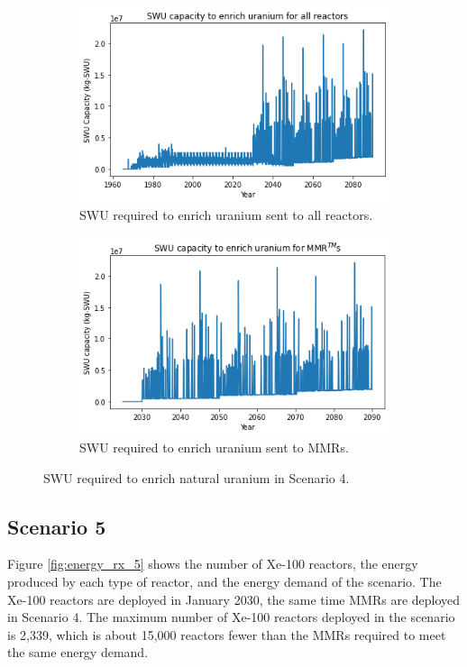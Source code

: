 \begin{figure}
    \centering
    \begin{subfigure}{0.45\textwidth}
        \centering
        \includegraphics[scale=0.4]{../figures/totalswu_scenarios_4.png}
        \caption{\gls{SWU} required to enrich uranium sent to all reactors.}
        \label{fig:totalswu_4}
    \end{subfigure}
    \hspace{0.8cm}
    \begin{subfigure}{0.45\textwidth}
        \centering
        \includegraphics[scale=0.4]{../figures/haleuSWU_scenarios_4.png}
        \caption{\gls{SWU} required to enrich uranium sent to \glspl{MMR}.}
        \label{fig:haleuswu_4}
    \end{subfigure}
    \caption{\gls{SWU} required to enrich natural uranium in Scenario 4.}
    \label{fig:swu_4}
\end{figure}


\subsection{Scenario 5}
Figure \ref{fig:energy_rx_5} shows the number of Xe-100 reactors, the 
energy produced by each type of reactor, and the energy demand of the 
scenario. The Xe-100 reactors are deployed in January 2030, the 
same time 
\glspl{MMR} are deployed in Scenario 4. The maximum number of Xe-100 
reactors deployed in the scenario is 2,339, which is about 15,000 reactors 
fewer than the \glspl{MMR} required to meet the same energy demand. 

